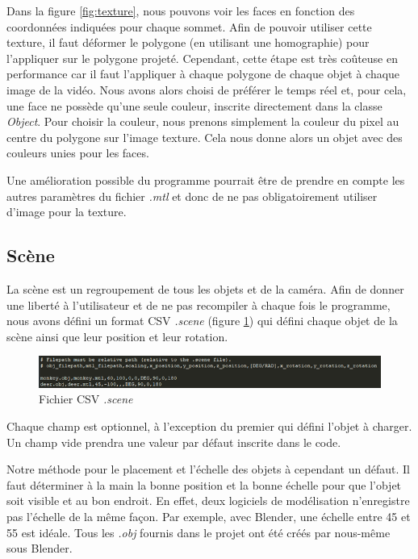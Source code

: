             Dans la figure \ref{fig:texture}, nous pouvons voir les faces en fonction des coordonnées indiquées pour chaque sommet. Afin de pouvoir utiliser cette texture, il faut déformer le polygone (en utilisant une homographie) pour l'appliquer sur le polygone projeté. Cependant, cette étape est très coûteuse en performance car il faut l'appliquer à chaque polygone de chaque objet à chaque image de la vidéo. Nous avons alors choisi de préférer le temps réel et, pour cela, une face ne possède qu'une seule couleur, inscrite directement dans la classe \emph{Object}. Pour choisir la couleur, nous prenons simplement la couleur du pixel au centre du polygone sur l'image texture. Cela nous donne alors un objet avec des couleurs unies pour les faces. 
            
            Une amélioration possible du programme pourrait être de prendre en compte les autres paramètres du fichier \emph{.mtl} et donc de ne pas obligatoirement utiliser d'image pour la texture.

        \subsection{Scène}

            La scène est un regroupement de tous les objets et de la caméra. Afin de donner une liberté à l'utilisateur et de ne pas recompiler à chaque fois le programme, nous avons défini un format CSV \emph{.scene} (figure \ref{fig:scene}) qui défini chaque objet de la scène ainsi que leur position et leur rotation.

            \begin{figure}[h]
                \centering
                \includegraphics[scale=0.8]{img/rendu/scene.png}
                \caption{Fichier CSV \emph{.scene}}
                \label{fig:scene}
            \end{figure}

            Chaque champ est optionnel, à l'exception du premier qui défini l'objet à charger. Un champ vide prendra une valeur par défaut inscrite dans le code.

            Notre méthode pour le placement et l'échelle des objets à cependant un défaut. Il faut déterminer à la main la bonne position et la bonne échelle pour que l'objet soit visible et au bon endroit. En effet, deux logiciels de modélisation n'enregistre pas l'échelle de la même façon. Par exemple, avec Blender, une échelle entre 45 et 55 est idéale. Tous les \emph{.obj} fournis dans le projet ont été créés par nous-même sous Blender.

